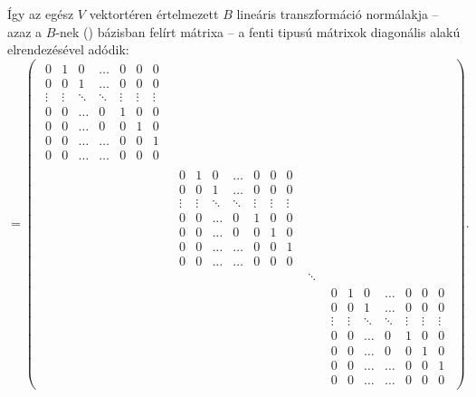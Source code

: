 \documentclass[9pt, a4paper, showtrims]{memoir}
\theoremstyle{plain}
\theoremstyle{remark}
\theoremstyle{definition}
\begin{document}
Így az egész $V$ vektortéren értelmezett $B$ lineáris transzformáció normálakja
--
azaz a $B$-nek (\dag) bázisban felírt mátrixa
--
a fenti tipusú mátrixok diagonális alakú elrendezésével adódik:
\begin{displaymath}
	[B]=
	\begin{pmatrix}
		\begin{matrix}
			0      & 1      & 0      & \dots  & 0      & 0      & 0      \\
			0      & 0      & 1      & \dots  & 0      & 0      & 0      \\
			\vdots & \vdots & \ddots & \ddots & \vdots & \vdots & \vdots \\
			0      & 0      & \dots  & 0      & 1      & 0      & 0      \\
			0      & 0      & \dots  & 0      & 0      & 1      & 0      \\
			0      & 0      & \dots  & \dots  & 0      & 0      & 1      \\
			0      & 0      & \dots  & \dots  & 0      & 0      & 0
		\end{matrix} &   &        & \\
		                                &
		\begin{matrix}
			0      & 1      & 0      & \dots  & 0      & 0      & 0      \\
			0      & 0      & 1      & \dots  & 0      & 0      & 0      \\
			\vdots & \vdots & \ddots & \ddots & \vdots & \vdots & \vdots \\
			0      & 0      & \dots  & 0      & 1      & 0      & 0      \\
			0      & 0      & \dots  & 0      & 0      & 1      & 0      \\
			0      & 0      & \dots  & \dots  & 0      & 0      & 1      \\
			0      & 0      & \dots  & \dots  & 0      & 0      & 0
		\end{matrix}
		                                &   &          \\
		                                &   & \ddots & \\
		                                &   &        &
		\begin{matrix}
			0      & 1      & 0      & \dots  & 0      & 0      & 0      \\
			0      & 0      & 1      & \dots  & 0      & 0      & 0      \\
			\vdots & \vdots & \ddots & \ddots & \vdots & \vdots & \vdots \\
			0      & 0      & \dots  & 0      & 1      & 0      & 0      \\
			0      & 0      & \dots  & 0      & 0      & 1      & 0      \\
			0      & 0      & \dots  & \dots  & 0      & 0      & 1      \\
			0      & 0      & \dots  & \dots  & 0      & 0      & 0
		\end{matrix}
	\end{pmatrix}.
\end{displaymath}
\end{document}
